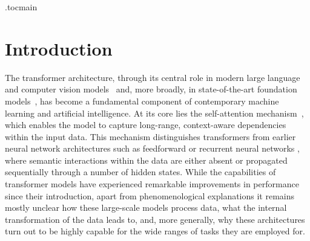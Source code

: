 \documentclass[10pt]{article}
\theoremstyle{definition}
\theoremstyle{definition}
\numberwithin{equation}{section}
\begin{document}
\newpage 
\tableofcontents

\etocdepthtag.toc{main}



\section{Introduction}\label{sec:intro}

The transformer architecture, through its central role in modern large language and computer vision models~\cite{bert,dosovitskiy2021an,gemini2023,gpt,llama} and, more broadly, in state-of-the-art foundation models~\cite{bommasani2021opportunities}, has become a fundamental component of contemporary machine learning and artificial intelligence.
At its core lies the self-attention mechanism~\cite{vaswani2017attention}, which enables the model to capture long-range, context-aware dependencies within the input data.
This mechanism distinguishes transformers from earlier neural network architectures such as feedforward \cite{krizhevsky2012imagenet} or recurrent neural networks \cite{hochreiter1997long}, where semantic interactions within the data are either absent or propagated sequentially through a number of hidden states.
While the capabilities of transformer models have experienced remarkable improvements in performance since their introduction,
apart from phenomenological explanations it remains mostly unclear how these large-scale models process data, what the internal transformation of the data leads to, and, more generally, why these architectures turn out to be highly capable for the wide ranges of tasks they are employed for. 
\end{document}
